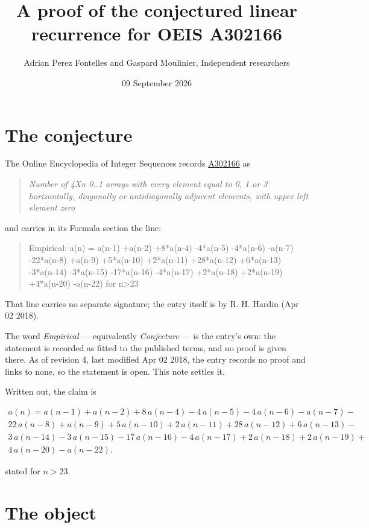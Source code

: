 \documentclass[11pt]{article}
\title{A proof of the conjectured linear recurrence for OEIS A302166}
\author{Adrian Perez Fontelles and Gaspard Moulinier, Independent researchers}
\date{09 September 2026}
\theoremstyle{definition}
\begin{document}
\maketitle
\section{The conjecture}

The Online Encyclopedia of Integer Sequences records \href{https://oeis.org/A302166}{A302166} as

\begin{quote}\itshape Number of 4Xn 0..1 arrays with every element equal to 0, 1 or 3 horizontally, diagonally or antidiagonally adjacent elements, with upper left element zero\end{quote}

and carries in its Formula section the line:

\begin{quote}\ttfamily Empirical: a(n) = a(n-1) +a(n-2) +8*a(n-4) -4*a(n-5) -4*a(n-6) -a(n-7) -22*a(n-8) +a(n-9) +5*a(n-10) +2*a(n-11) +28*a(n-12) +6*a(n-13) -3*a(n-14) -3*a(n-15) -17*a(n-16) -4*a(n-17) +2*a(n-18) +2*a(n-19) +4*a(n-20) -a(n-22) for n>23\end{quote}

That line carries no separate signature; the entry itself is by R. H. Hardin (Apr 02 2018).

The word {\itshape Empirical} --- equivalently {\itshape Conjecture} --- is the entry's own: the statement is recorded as fitted to the published terms, and no proof is given there. As of revision 4, last modified Apr 02 2018, the entry records no proof and links to none, so the statement is open. This note settles it.

Written out, the claim is

\begin{multline*} a(n) = a(n-1) + a(n-2) + 8\,a(n-4) - 4\,a(n-5) - 4\,a(n-6) - a(n-7) - \\ 22\,a(n-8) + a(n-9) + 5\,a(n-10) + 2\,a(n-11) + 28\,a(n-12) + 6\,a(n-13) - \\ 3\,a(n-14) - 3\,a(n-15) - 17\,a(n-16) - 4\,a(n-17) + 2\,a(n-18) + 2\,a(n-19) + \\ 4\,a(n-20) - a(n-22). \end{multline*}

stated for $n > 23$.

\section{The object}
\end{document}
